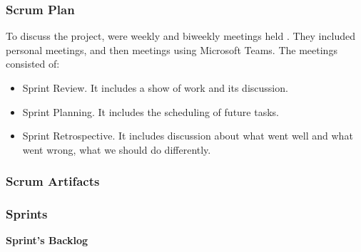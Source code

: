 \documentclass{scrartcl}
\begin{document}
  	    \subsubsection{Scrum Plan}
  	    To discuss the project, were weekly and biweekly meetings held . They included personal meetings, and then meetings using Microsoft Teams. The meetings consisted of:
  	    \begin{itemize}
  	    \item Sprint Review. It includes a show of work and its discussion.
  	    \item Sprint Planning. It includes the scheduling of future tasks.
  	    \item Sprint Retrospective. It includes discussion about what went well and what went wrong, what we should do differently. 
  	    \end{itemize}
  		\subsubsection{Scrum Artifacts }
  		
  		\subsubsection{Sprints}
  		
%
\textbf{Sprint's Backlog}
\end{document}

